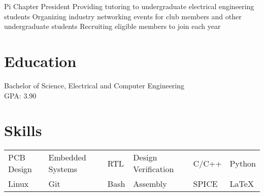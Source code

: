 \documentclass{my_cv}
\begin{document}
\vspace{-0.75em}
Pi Chapter President
\workitems
    {Providing tutoring to undergraduate electrical engineering students}
    {Organizing industry networking events for club members and other undergraduate students}
    {Recruiting eligible members to join each year}

\section{Education}
\vspace{-0.75em}
Bachelor of Science, Electrical and Computer Engineering \\
GPA: 3.90

\section{Skills}

\noindent\begin{tabular}{@{}l l l l l l}
    PCB Design & Embedded Systems & RTL & Design Verification & C/C++ & Python\\
    Linux & Git & Bash & Assembly & SPICE & \LaTeX\\
\end{tabular}
\end{document}
